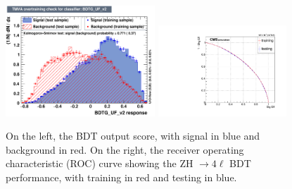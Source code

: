\begin{figure}[!htb]
    \centering
    \captionsetup{justification=justified}
    \includegraphics[width=0.50\textwidth]{pics/VH_sec/BDT_train_ZH/ZH_BDT_overtrain.pdf}
    \includegraphics[width=0.43\textwidth]{pics/VH_sec/BDT_train_ZH/ZH_BDT_ROC.pdf}
    \caption{On the left, the BDT output score, with signal in blue and background in red.  On the right, 
             the receiver operating characteristic (ROC) curve showing the ZH $\to 4\ell$ BDT performance, 
             with training in red and testing in blue.}
    \label{fig:zh_BDT_out}
\end{figure}

